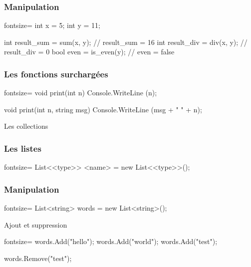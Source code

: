 \begin{frame}[fragile]
  \frametitle{Manipulation}

  \begin{csharpcode*}{fontsize=\scriptsize}
    int x = 5;
    int y = 11;

    int result_sum = sum(x, y); // result_sum = 16
    int result_div = div(x, y); // result_div = 0
    bool even = is_even(y); // even = false
  \end{csharpcode*}
\end{frame}

\begin{frame}[fragile]
  \frametitle{Les fonctions surchargées}

  \begin{csharpcode*}{fontsize=\scriptsize}
    void print(int n)
    {
      Console.WriteLine (n);
    }

    void print(int n, string msg)
    {
      Console.WriteLine (msg + " " + n);
    }
  \end{csharpcode*}
\end{frame}

\begin{frame}
  \begin{center}
    \vspace{1cm}
    Les collections
  \end{center}
\end{frame}

\begin{frame}[fragile]
  \frametitle{Les listes}

  \begin{csharpcode*}{fontsize=\scriptsize}
    List<<type>> <name> = new List<<type>>();
  \end{csharpcode*}
\end{frame}

\begin{frame}[fragile]
  \frametitle{Manipulation}

  \begin{csharpcode*}{fontsize=\scriptsize}
    List<string> words = new List<string>();
  \end{csharpcode*}

  \pause

  \begin{center}{\large Ajout et suppression}\end{center}
  \begin{csharpcode*}{fontsize=\scriptsize}
    words.Add("hello");
    words.Add("world");
    words.Add("test");

    words.Remove("test");
  \end{csharpcode*}
\end{frame}

